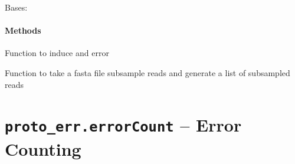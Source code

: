 \documentclass[letterpaper,10pt,english]{sphinxmanual}
\begin{document}

\begin{fulllineitems}
\label{index:proto_err.simulation.singleSNP}
Bases: {\hyperref[index:proto_err.simulation.simulateError]{}}
\paragraph{Methods}

\begin{fulllineitems}
\label{index:proto_err.simulation.singleSNP.error}
Function to induce and error

\end{fulllineitems}


\end{fulllineitems}


\begin{fulllineitems}
\label{index:proto_err.simulation.subsample}
Function to take a fasta file subsample reads and generate a list of 
subsampled reads

\end{fulllineitems}



\section{\texttt{proto\_err.errorCount} -- Error Counting}
\label{index:proto-err-errorcount-error-counting}\label{index:module-proto_err.errorCount}
\end{document}

